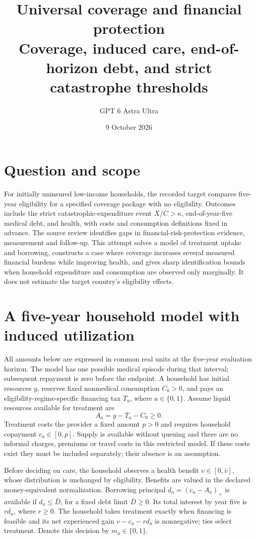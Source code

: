 \documentclass[11pt]{article}
\title{Universal coverage and financial protection\\[4pt]\large Coverage, induced care, end-of-horizon debt, and strict catastrophe thresholds}
\author{GPT 6 Astra Ultra}
\date{9 October 2026}
\theoremstyle{remark}\newtheorem{remark}[theorem]{Remark}
\begin{document}
\maketitle

\section*{Question and scope}
For initially uninsured low-income households, the recorded target compares five-year eligibility for a specified coverage package with no eligibility. Outcomes include the strict catastrophic-expenditure event $X/C>\kappa$, end-of-year-five medical debt, and health, with costs and consumption definitions fixed in advance. The source review \cite{bhatia} identifies gaps in financial-risk-protection evidence, measurement and follow-up. This attempt solves a model of treatment uptake and borrowing, constructs a case where coverage increases several measured financial burdens while improving health, and gives sharp identification bounds when household expenditure and consumption are observed only marginally. It does not estimate the target country's eligibility effects.

\section*{A five-year household model with induced utilization}
All amounts below are expressed in common real units at the five-year evaluation horizon. The model has one possible medical episode during that interval; subsequent repayment is zero before the endpoint. A household has initial resources $y$, reserves fixed nonmedical consumption $C_0>0$, and pays an eligibility-regime-specific financing tax $T_a$, where $a\in\{0,1\}$. Assume liquid resources available for treatment are
\[
 A_a=y-T_a-C_0\ge0.
\]
Treatment costs the provider a fixed amount $p>0$ and requires household copayment $c_a\in[0,p]$. Supply is available without queuing and there are no informal charges, premiums or travel costs in this restricted model. If these costs exist they must be included separately; their absence is an assumption.

Before deciding on care, the household observes a health benefit $v\in[0,\bar v]$, whose distribution is unchanged by eligibility. Benefits are valued in the declared money-equivalent normalization. Borrowing principal $d_a=(c_a-A_a)_+$ is available if $d_a\le\bar D$, for a fixed debt limit $\bar D\ge0$. Its total interest by year five is $r d_a$, where $r\ge0$. The household takes treatment exactly when financing is feasible and its net experienced gain $v-c_a-rd_a$ is nonnegative; ties select treatment. Denote this decision by $m_a\in\{0,1\}$.
\end{document}
